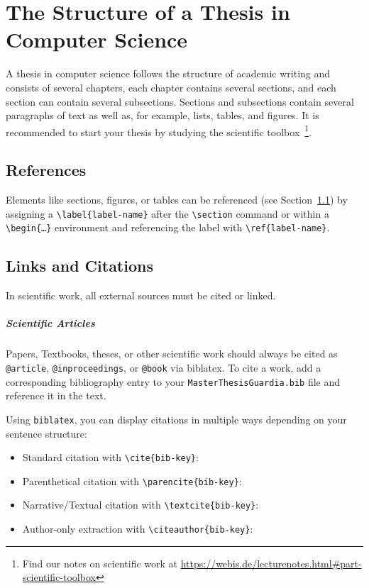\chapter{The Structure of a Thesis in Computer Science}\label{structure}

A thesis in computer science follows the structure of academic writing and consists of several chapters, each chapter contains several sections, and each section can contain several subsections. Sections and subsections contain several paragraphs of text as well as, for example, lists, tables, and figures. It is recommended to start your thesis by studying the scientific toolbox~\footnote{Find our notes on scientific work at \url{https://webis.de/lecturenotes.html\#part-scientific-toolbox}}.

\enlargethispage{\baselineskip}

\section{References}\label{references}

Elements like sections, figures, or tables can be referenced (see Section~\ref{references}) by assigning a \texttt{\textbackslash label\{label-name\}} after the \texttt{\textbackslash section} command or within a \texttt{\textbackslash begin\{\dots\}} environment and referencing the label with \texttt{\textbackslash ref\{label-name\}}.

\section{Links and Citations}

In scientific work, all external sources must be cited or linked.

\paragraph{Scientific Articles} Papers, Textbooks, theses, or other scientific work should always be cited as \texttt{@article}, \texttt{@inproceedings}, or \texttt{@book} via biblatex. To cite a work, add a corresponding bibliography entry to your \texttt{MasterThesisGuardia.bib} file and reference it in the text.

Using \texttt{biblatex}, you can display citations in multiple ways depending on your sentence structure:
\begin{itemize}
    \item Standard citation with \texttt{\textbackslash cite\{bib-key\}}: \cite{kabanov51Attacks602026}
    \item Parenthetical citation with \texttt{\textbackslash parencite\{bib-key\}}: \parencite{manning:2001}
    \item Narrative/Textual citation with \texttt{\textbackslash textcite\{bib-key\}}: \textcite{manning:2001}
    \item Author-only extraction with \texttt{\textbackslash citeauthor\{bib-key\}}: \citeauthor{manning:2001}
\end{itemize}

